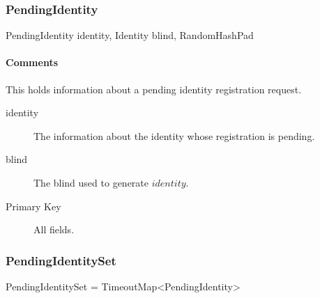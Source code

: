 \documentclass[a4paper,10pt]{article}
\begin{document}
\begin{inparaitem}[ ]
 \item \persistent
 \item \secure
 \item \unique
\end{inparaitem}

\subsubsection{PendingIdentity}

\begin{verbbox}
PendingIdentity
{
  identity, Identity
  blind, RandomHashPad
}
\end{verbbox}
\begin{center}
\theverbbox
\end{center}

\begin{inparaitem}[ ]
 \item \infrastructure
\end{inparaitem}

\paragraph*{Comments}
This holds information about a pending identity registration request.

\SpecialItem
\begin{description}
 \item[identity] The information about the identity whose registration is pending.
 \item[blind] The blind used to generate $identity$.
\end{description}

\SpecialItem
\begin{description}
 \item[Primary Key] All fields.
\end{description}

\subsubsection{PendingIdentitySet}

\begin{verbbox}
PendingIdentitySet = TimeoutMap<PendingIdentity>
\end{verbbox}
\begin{center}
\theverbbox
\end{center}
\end{document}
